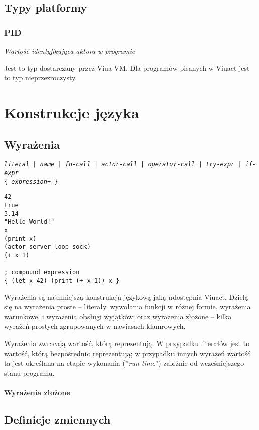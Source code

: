 \documentclass[11pt,oneside,a4paper,titlepage,onecolumn]{article}
\begin{document}
\subsection{Typy platformy}

\subsubsection{PID}

\emph{Wartość identyfikująca aktora w programie}

Jest to typ dostarczany przez Viua VM. Dla programów pisanych w Viuact jest to
typ nieprzezroczysty.

\newpage
\section{Konstrukcje języka}

\subsection{Wyrażenia}

\texttt{\emph{literal}
| \emph{name}
| \emph{fn-call}
| \emph{actor-call}
| \emph{operator-call}
| \emph{try-expr}
| \emph{if-expr}}
\\
\texttt{\{ \emph{expression}+ \}}

\begin{lstlisting}
42
true
3.14
"Hello World!"
x
(print x)
(actor server_loop sock)
(+ x 1)

; compound expression
{ (let x 42) (print (+ x 1)) x }
\end{lstlisting}

Wyrażenia są najmniejszą konstrukcją językową jaką udostępnia Viuact.
Dzielą się na wyrażenia proste -- literały, wywołania funkcji w różnej formie, wyrażenia warunkowe, i wyrażenia
obsługi wyjątków; oraz wyrażenia złożone -- kilka wyrażeń prostych zgrupowanych w nawiasach klamrowych.

Wyrażenia zwracają wartość, którą reprezentują. W przypadku literałów jest to wartość, którą bezpośrednio
reprezentują; w przypadku innych wyrażeń wartość ta jest określana na etapie wykonania (''\emph{run-time}'')
zależnie od wcześniejszego stanu programu.

\paragraph{Wyrażenia złożone}

\subsection{Definicje zmiennych}
\end{document}
